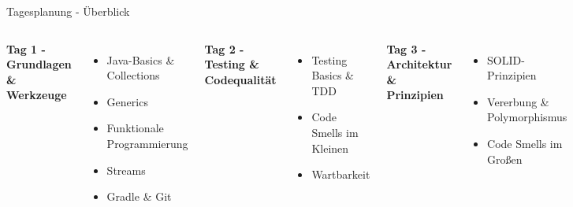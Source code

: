 \begin{frame}{Tagesplanung - Überblick}
  \begin{columns}[T]
    \textbf{Tag 1 - Grundlagen \& Werkzeuge}
    \begin{itemize}
      \item Java-Basics \& Collections
      \item Generics
      \item Funktionale Programmierung
      \item Streams
      \item Gradle \& Git
    \end{itemize}

    \textbf{Tag 2 - Testing \& Codequalität}
    \begin{itemize}
      \item Testing Basics \& TDD
      \item Code Smells im Kleinen
      \item Wartbarkeit
    \end{itemize}

    \textbf{Tag 3 - Architektur \& Prinzipien}
    \begin{itemize}
      \item SOLID-Prinzipien
      \item Vererbung \& Polymorphismus
      \item Code Smells im Großen
    \end{itemize}

    \textbf{Tag 4 - Fortgeschrittene Themen}
    \begin{itemize}
      \item Mocking \& Test-Doubles
      \item Spring Framework
      \item Git im Detail
    \end{itemize}

    \textbf{Tag 5 - Klausurvorbereitung}
    \begin{itemize}
      \item Altklausuren lösen
    \end{itemize}
  \end{columns}
\end{frame}

